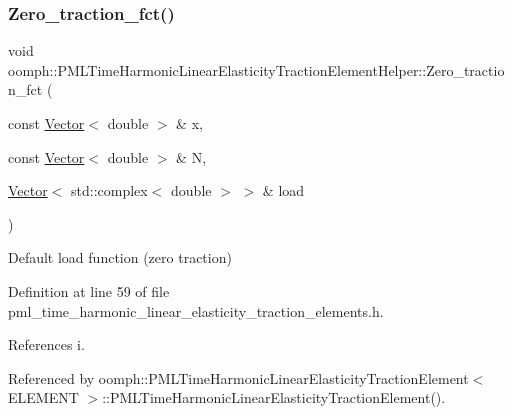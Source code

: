 \subsubsection{\texorpdfstring{Zero\+\_\+traction\+\_\+fct()}{Zero\_traction\_fct()}}
{\footnotesize\ttfamily void oomph\+::\+P\+M\+L\+Time\+Harmonic\+Linear\+Elasticity\+Traction\+Element\+Helper\+::\+Zero\+\_\+traction\+\_\+fct (\begin{DoxyParamCaption}\item[{const \hyperlink{classoomph_1_1Vector}{Vector}$<$ double $>$ \&}]{x,  }\item[{const \hyperlink{classoomph_1_1Vector}{Vector}$<$ double $>$ \&}]{N,  }\item[{\hyperlink{classoomph_1_1Vector}{Vector}$<$ std\+::complex$<$ double $>$ $>$ \&}]{load }\end{DoxyParamCaption})}



Default load function (zero traction) 



Definition at line 59 of file pml\+\_\+time\+\_\+harmonic\+\_\+linear\+\_\+elasticity\+\_\+traction\+\_\+elements.\+h.



References i.



Referenced by oomph\+::\+P\+M\+L\+Time\+Harmonic\+Linear\+Elasticity\+Traction\+Element$<$ E\+L\+E\+M\+E\+N\+T $>$\+::\+P\+M\+L\+Time\+Harmonic\+Linear\+Elasticity\+Traction\+Element().


